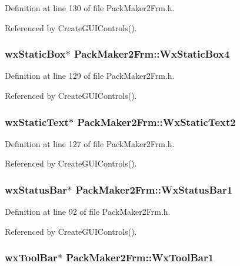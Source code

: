 Definition at line 130 of file Pack\-Maker2Frm.h.

Referenced by Create\-GUIControls().
\subsubsection{\setlength{\rightskip}{0pt plus 5cm}wx\-Static\-Box$\ast$ {\bf Pack\-Maker2Frm::Wx\-Static\-Box4}\hspace{0.3cm}{\tt  [private]}}\label{class_pack_maker2_frm_4828adfc416922895fd9670e182b8166}




Definition at line 129 of file Pack\-Maker2Frm.h.

Referenced by Create\-GUIControls().
\subsubsection{\setlength{\rightskip}{0pt plus 5cm}wx\-Static\-Text$\ast$ {\bf Pack\-Maker2Frm::Wx\-Static\-Text2}\hspace{0.3cm}{\tt  [private]}}\label{class_pack_maker2_frm_39fd10af4b7df29a571f5e76db87564f}




Definition at line 127 of file Pack\-Maker2Frm.h.

Referenced by Create\-GUIControls().
\subsubsection{\setlength{\rightskip}{0pt plus 5cm}wx\-Status\-Bar$\ast$ {\bf Pack\-Maker2Frm::Wx\-Status\-Bar1}\hspace{0.3cm}{\tt  [private]}}\label{class_pack_maker2_frm_578239089b66977dc9868c8f121063f5}




Definition at line 92 of file Pack\-Maker2Frm.h.

Referenced by Create\-GUIControls().
\subsubsection{\setlength{\rightskip}{0pt plus 5cm}wx\-Tool\-Bar$\ast$ {\bf Pack\-Maker2Frm::Wx\-Tool\-Bar1}\hspace{0.3cm}{\tt  [private]}}\label{class_pack_maker2_frm_4a0a59dc1a352808eb1ed436518d500c}




